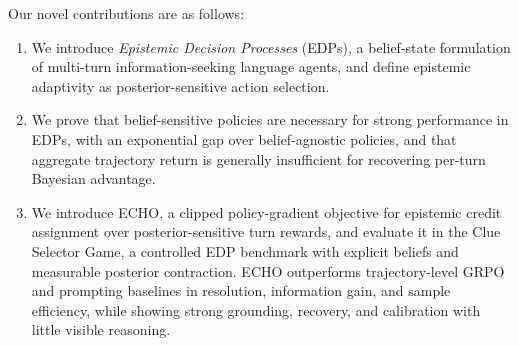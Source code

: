 \documentclass[11pt]{article}
\theoremstyle{plain}
\theoremstyle{definition}
\theoremstyle{remark}
\begin{document}
Our novel contributions are as follows:
\begin{enumerate}
    \item We introduce \emph{Epistemic Decision Processes} (EDPs), a belief-state formulation of multi-turn information-seeking language agents, and define epistemic adaptivity as posterior-sensitive action selection.
    \item We prove that belief-sensitive policies are necessary for strong performance in EDPs, with an exponential gap over belief-agnostic policies, and that aggregate trajectory return is generally insufficient for recovering per-turn Bayesian advantage.

    \item We introduce \textsc{ECHO}, a clipped policy-gradient objective for epistemic credit assignment over posterior-sensitive turn rewards, and evaluate it in the Clue Selector Game, a controlled EDP benchmark with explicit beliefs and measurable posterior contraction. \textsc{ECHO} outperforms trajectory-level GRPO and prompting baselines in resolution, information gain, and sample efficiency, while showing strong grounding, recovery, and calibration with little visible reasoning.

\end{enumerate}
\end{document}
